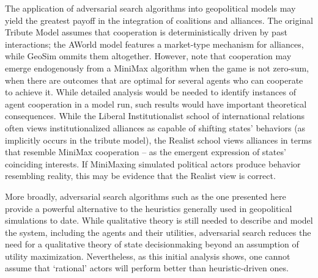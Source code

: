 \documentclass{article}
\begin{document}
The application of adversarial search algorithms into geopolitical models may yield the greatest payoff in the integration of coalitions and alliances. The original Tribute Model assumes that cooperation is deterministically driven by past interactions; the AWorld \citep{min_2003} model features a market-type mechanism for alliances, while GeoSim \citep{cederman_2003} ommits them altogether. However, \citet{russel_2009} note that cooperation may emerge endogenously from a MiniMax algorithm when the game is not zero-sum, when there are outcomes that are optimal for several agents who can cooperate to achieve it. While detailed analysis would be needed to identify instances of agent cooperation in a model run, such results would have important theoretical consequences. While the Liberal Institutionalist school of international relations often views institutionalized alliances as capable of shifting states' behaviors (as implicitly occurs in the tribute model), the Realist school \citep{mearsheimer_1995} views alliances in terms that resemble MiniMax cooperation -- as the emergent expression of states' coinciding interests. If MiniMaxing simulated political actors produce behavior resembling reality, this may be evidence that the Realist view is correct. 

More broadly, adversarial search algorithms such as the one presented here provide a powerful alternative to the heuristics generally used in geopolitical simulations to date. While qualitative theory is still needed to describe and model the system, including the agents and their utilities, adversarial search reduces the need for a qualitative theory of state decisionmaking beyond an assumption of utility maximization. Nevertheless, as this initial analysis shows, one cannot assume that `rational' actors will perform better than heuristic-driven ones.





\end{document}
